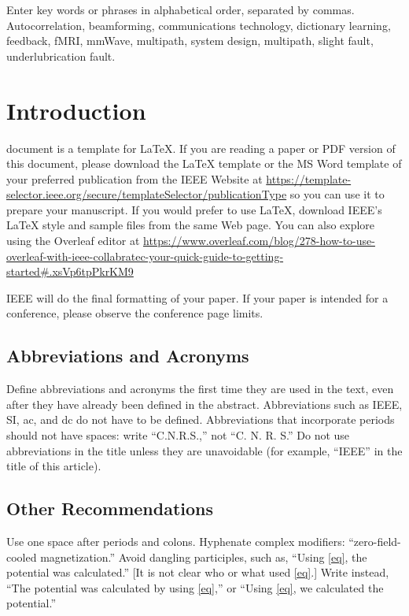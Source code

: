 \documentclass{ieeeaccess}
\begin{document}
\begin{keywords}
Enter key words or phrases in alphabetical
order, separated by commas. Autocorrelation, beamforming, communications technology, dictionary learning, feedback, fMRI, mmWave, multipath, system design, multipath, slight fault, underlubrication fault.
\end{keywords}

\titlepgskip=-21pt

\maketitle

\section{Introduction}
\label{sec:introduction}
 document is a template for \LaTeX. If you are reading a paper or PDF version of this document, please download the LaTeX template or the MS Word
template of your preferred publication from the IEEE Website at \underline
{https://template-selector.ieee.org/secure/templateSelec}\break\underline{tor/publicationType} so you can use it to prepare your manuscript. 
If you would prefer to use LaTeX, download IEEE's LaTeX style and sample files
from the same Web page. You can also explore using the Overleaf editor at
\underline
{https://www.overleaf.com/blog/278-how-to-use-overleaf-}\break\underline{with-ieee-collabratec-your-quick-guide-to-getting-started}\break\underline{\#.xsVp6tpPkrKM9}

IEEE will do the final formatting of your paper. If your paper is intended
for a conference, please observe the conference page limits.

\subsection{Abbreviations and Acronyms}
Define abbreviations and acronyms the first time they are used in the text,
even after they have already been defined in the abstract. Abbreviations
such as IEEE, SI, ac, and dc do not have to be defined. Abbreviations that
incorporate periods should not have spaces: write ``C.N.R.S.,'' not ``C. N.
R. S.'' Do not use abbreviations in the title unless they are unavoidable
(for example, ``IEEE'' in the title of this article).

\subsection{Other Recommendations}
Use one space after periods and colons. Hyphenate complex modifiers:
``zero-field-cooled magnetization.'' Avoid dangling participles, such as,
``Using \eqref{eq}, the potential was calculated.'' [It is not clear who or what
used \eqref{eq}.] Write instead, ``The potential was calculated by using \eqref{eq},'' or
``Using \eqref{eq}, we calculated the potential.''
\end{document}
